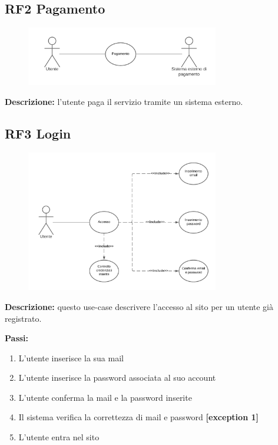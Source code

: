 \documentclass[a4paper,12pt]{article}
\begin{document}
\newpage

\subsection*{RF2 Pagamento}

\begin{figure}[htp]
    \centering
    \includegraphics[width=0.75\textwidth]{diagrams/use-case-2.png}
\end{figure}

\textbf{Descrizione:} l'utente paga il servizio tramite un sistema esterno. 

\vspace{1em}
\subsection*{RF3 Login}

\begin{figure}[htp]
    \centering
    \includegraphics[width=0.75\textwidth]{diagrams/use-case-3.png}
\end{figure}

\textbf{Descrizione:} questo use-case descrivere l’accesso al sito per un utente già registrato.

\textbf{Passi:}
\begin{enumerate}
    \item L’utente inserisce la sua mail 
    \item L’utente inserisce la password associata al suo account 
    \item L’utente conferma la mail e la password inserite
    \item Il sistema verifica la correttezza di mail e password \textbf{[exception 1]}
    \item L’utente entra nel sito
\end{enumerate}
\end{document}
